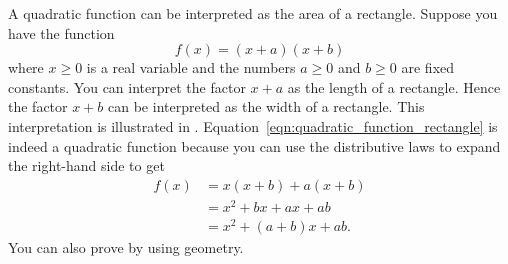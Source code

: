 \documentclass[a4paper,oneside,12pt]{article}
\begin{document}
A quadratic function can be interpreted as the area of a rectangle.
Suppose you have the function
\begin{equation}
\label{eqn:quadratic_function_rectangle}
f(x)
=
(x + a)(x + b)
\end{equation}
where $x \geq 0$ is a real variable and the numbers $a \geq 0$ and
$b \geq 0$ are fixed constants.  You can interpret the factor
$x + a$ as the length of a rectangle.  Hence the factor $x + b$ can be
interpreted as the width of a rectangle.  This interpretation is
illustrated in .
Equation~\eqref{eqn:quadratic_function_rectangle} is indeed a
quadratic function because you can use the distributive laws to expand
the right-hand side to get
\begin{equation}
\label{eqn:rectangle_as_quadratic}
\begin{aligned}
f(x)
&=
x(x + b) + a(x + b) \\[4pt]
&=
x^2 + bx + ax + ab \\[4pt]
&=
x^2 + (a + b)x + ab.
\end{aligned}
\end{equation}
You can also prove  by using
geometry.
\end{document}

